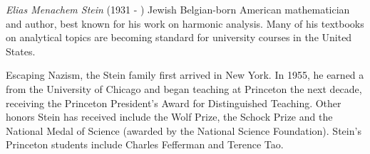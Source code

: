 \documentclass[12pt]{article}
\begin{document}
\emph{Elias Menachem Stein} (1931 - ) Jewish Belgian-born American mathematician and author, best known for his work on harmonic analysis. Many of his textbooks on analytical topics are becoming standard for university courses in the United States.

Escaping Nazism, the Stein family first arrived in New York. In 1955, he earned a  from the University of Chicago and began teaching at Princeton the next decade,  receiving the Princeton President's Award for Distinguished Teaching. Other honors Stein has received include the Wolf Prize, the Schock Prize and the National Medal of Science (awarded by the National Science Foundation). Stein's Princeton students include Charles Fefferman and Terence Tao.
\end{document}
